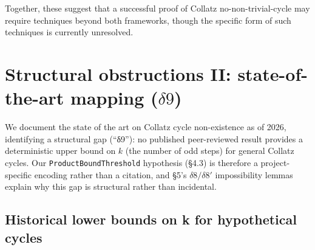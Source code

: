 \documentclass[
  11pt]{amsart}
\theoremstyle{plain}
\theoremstyle{definition}
\theoremstyle{remark}
\begin{document}
Together, these suggest that a successful proof of Collatz
no-non-trivial-cycle may require techniques beyond both frameworks,
though the specific form of such techniques is currently unresolved.

\section{\texorpdfstring{Structural obstructions II: state-of-the-art
mapping
(\(\delta 9\))}{Structural obstructions II: state-of-the-art mapping (\textbackslash delta 9)}}\label{structural-obstructions-ii-state-of-the-art-mapping-delta-9}

We document the state of the art on Collatz cycle non-existence as of
2026, identifying a structural gap (``δ9''): no published peer-reviewed
result provides a deterministic upper bound on \(k\) (the number of odd
steps) for general Collatz cycles. Our \texttt{ProductBoundThreshold}
hypothesis (§4.3) is therefore a project-specific encoding rather than a
citation, and §5's \(\delta 8 / \delta 8'\) impossibility lemmas explain
why this gap is structural rather than incidental.

\subsection{Historical lower bounds on k for hypothetical
cycles}\label{historical-lower-bounds-on-k-for-hypothetical-cycles}
\end{document}

